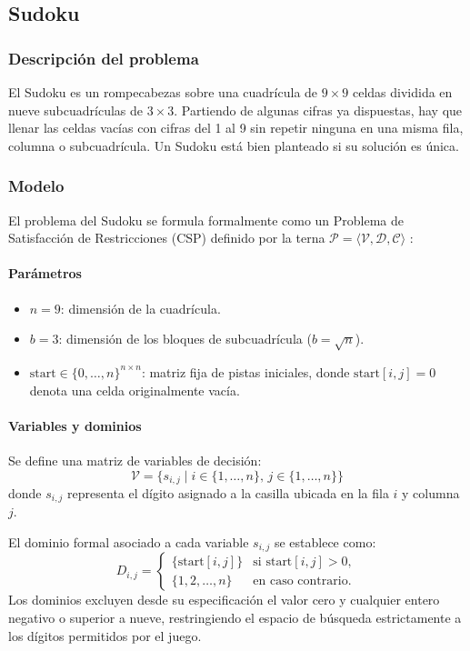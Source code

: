 \subsection{Sudoku}
\label{sec:sudoku}

\subsubsection{Descripción del problema}

El Sudoku es un rompecabezas sobre una cuadrícula de $9 \times 9$ celdas dividida en nueve subcuadrículas de $3 \times 3$. Partiendo de algunas cifras ya dispuestas, hay que llenar las celdas vacías con cifras del 1 al 9 sin repetir ninguna en una misma fila, columna o subcuadrícula. Un Sudoku está bien planteado si su solución es única.

\subsubsection{Modelo}
El problema del Sudoku se formula formalmente como un Problema de Satisfacción de Restricciones (CSP) definido por la terna $\mathcal{P} = \langle \mathcal{V}, \mathcal{D}, \mathcal{C} \rangle$ \parencite{apt2003principles}:

\paragraph{Parámetros}
\begin{itemize}
    \item $n = 9$: dimensión de la cuadrícula.
    \item $b = 3$: dimensión de los bloques de subcuadrícula ($b = \sqrt{n}$).
    \item $\text{start} \in \{0, \dots, n\}^{n \times n}$: matriz fija de pistas iniciales, donde $\text{start}[i, j] = 0$ denota una celda originalmente vacía.
\end{itemize}

\paragraph{Variables y dominios}
Se define una matriz de variables de decisión:
\[
\mathcal{V} = \{s_{i,j} \mid i \in \{1, \dots, n\}, \, j \in \{1, \dots, n\}\}
\]
donde $s_{i,j}$ representa el dígito asignado a la casilla ubicada en la fila $i$ y columna $j$.

El dominio formal asociado a cada variable $s_{i,j}$ se establece como:
\[
D_{i,j} = 
\begin{cases}
\{\text{start}[i,j]\} & \text{si } \text{start}[i,j] > 0, \\
\{1, 2, \dots, n\} & \text{en caso contrario.}
\end{cases}
\]
Los dominios excluyen desde su especificación el valor cero y cualquier entero negativo o superior a nueve, restringiendo el espacio de búsqueda estrictamente a los dígitos permitidos por el juego.


